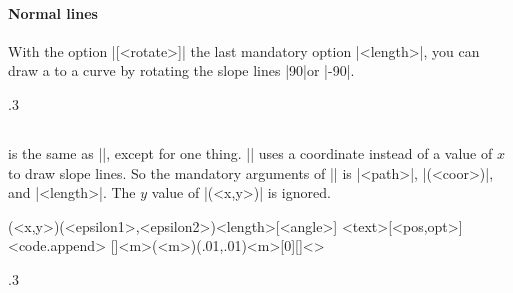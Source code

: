 \paragraph{Normal lines}
With the option |[<rotate>]|  the last mandatory option |{<length>}|, you can draw a  to a curve by rotating the slope lines |90|\textdegree or |-90|\textdegree.

\begin{tzcode}{.3}
\end{tzcode}





\subsection{\protect\cmd{\tzslope}}
\label{ss:tzslope}

\icmd{\tzslope} is the same as |\tzslopeat|, except for one thing.
|\tzslope| uses a coordinate instead of a value of $x$ to draw slope lines.
So the mandatory arguments of |\tzslope| is |{<path>}|, |(<coor>)|, and |{<length>}|. The $y$ value of |(<x,y>)| is ignored.

\begin{tzdef}{}
(<x,y>)(<epsilon1>,<epsilon2>){<length>}[<angle>]
        {<text>}[<pos,opt>]<code.append>
  []{<m>}(<m>)(.01,.01){<m>}[0]{}[]<>
\end{tzdef}



\begin{tzcode}{.3}
\end{tzcode}



